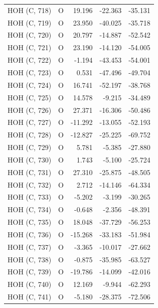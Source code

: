 \begin{longtable}{@{}lcrr@{}}
  \cmidrule(r){1-5}
  HOH (C, 718) & O & 19.196 & -22.363 & -35.131 \\
  \cmidrule(r){1-5}
  HOH (C, 719) & O & 23.950 & -40.025 & -35.718 \\
  \cmidrule(r){1-5}
  HOH (C, 720) & O & 20.797 & -14.887 & -52.542 \\
  \cmidrule(r){1-5}
  HOH (C, 721) & O & 23.190 & -14.120 & -54.005 \\
  \cmidrule(r){1-5}
  HOH (C, 722) & O & -1.194 & -43.453 & -54.001 \\
  \cmidrule(r){1-5}
  HOH (C, 723) & O & 0.531 & -47.496 & -49.704 \\
  \cmidrule(r){1-5}
  HOH (C, 724) & O & 16.741 & -52.197 & -38.768 \\
  \cmidrule(r){1-5}
  HOH (C, 725) & O & 14.578 & -9.215 & -34.489 \\
  \cmidrule(r){1-5}
  HOH (C, 726) & O & 27.371 & -16.306 & -50.486 \\
  \cmidrule(r){1-5}
  HOH (C, 727) & O & -11.292 & -13.055 & -52.193 \\
  \cmidrule(r){1-5}
  HOH (C, 728) & O & -12.827 & -25.225 & -69.752 \\
  \cmidrule(r){1-5}
  HOH (C, 729) & O & 5.781 & -5.385 & -27.880 \\
  \cmidrule(r){1-5}
  HOH (C, 730) & O & 1.743 & -5.100 & -25.724 \\
  \cmidrule(r){1-5}
  HOH (C, 731) & O & 27.310 & -25.875 & -48.505 \\
  \cmidrule(r){1-5}
  HOH (C, 732) & O & 2.712 & -14.146 & -64.334 \\
  \cmidrule(r){1-5}
  HOH (C, 733) & O & -5.202 & -3.199 & -30.265 \\
  \cmidrule(r){1-5}
  HOH (C, 734) & O & -0.648 & -2.356 & -48.391 \\
  \cmidrule(r){1-5}
  HOH (C, 735) & O & 18.048 & -37.729 & -56.253 \\
  \cmidrule(r){1-5}
  HOH (C, 736) & O & -15.268 & -33.183 & -51.984 \\
  \cmidrule(r){1-5}
  HOH (C, 737) & O & -3.365 & -10.017 & -27.662 \\
  \cmidrule(r){1-5}
  HOH (C, 738) & O & -0.875 & -35.985 & -63.527 \\
  \cmidrule(r){1-5}
  HOH (C, 739) & O & -19.786 & -14.099 & -42.016 \\
  \cmidrule(r){1-5}
  HOH (C, 740) & O & 12.169 & -9.944 & -62.293 \\
  \cmidrule(r){1-5}
  HOH (C, 741) & O & -5.180 & -28.375 & -72.506 \\

\end{longtable}
